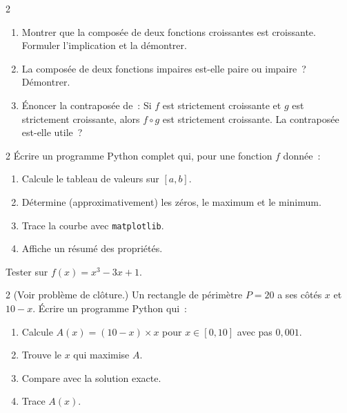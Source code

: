 \begin{probleme}{2}
\begin{enumerate}
  \item Montrer que la compos\'ee de deux fonctions croissantes est croissante.
        Formuler l'implication et la d\'emontrer.
  \item La compos\'ee de deux fonctions impaires est-elle paire ou impaire~?
        D\'emontrer.
  \item \'Enoncer la contrapos\'ee de~:
        \og Si $f$ est strictement croissante et $g$ est strictement croissante,
        alors $f\circ g$ est strictement croissante.\fg
        La contrapos\'ee est-elle utile~?
\end{enumerate}
\end{probleme}

\begin{probleme}{2}
\'Ecrire un programme Python complet qui, pour une fonction $f$ donn\'ee~:
\begin{enumerate}
  \item Calcule le tableau de valeurs sur $[a,b]$.
  \item D\'etermine (approximativement) les z\'eros, le maximum et le minimum.
  \item Trace la courbe avec \texttt{matplotlib}.
  \item Affiche un r\'esum\'e des propri\'et\'es.
\end{enumerate}
Tester sur $f(x)=x^3-3x+1$.
\end{probleme}

\begin{probleme}{2}
(Voir probl\`eme de cl\^oture.)
Un rectangle de p\'erim\`etre $P=20$ a ses c\^ot\'es $x$ et $10-x$.
\'Ecrire un programme Python qui~:
\begin{enumerate}
  \item Calcule $A(x)=(10-x)\times x$ pour $x\in[0,10]$ avec pas $0{,}001$.
  \item Trouve le $x$ qui maximise $A$.
  \item Compare avec la solution exacte.
  \item Trace $A(x)$.
\end{enumerate}
\end{probleme}


